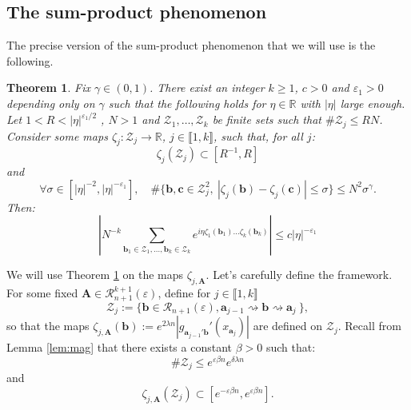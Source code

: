 \documentclass[a4paper]{article}
\newtheorem{theorem}{Theorem}[section]
\theoremstyle{definition}
\begin{document}
\subsection{The sum-product phenomenon}\label{sec:sumprod}


The precise version of the sum-product phenomenon that we will use is the following.

\begin{theorem}\label{th:sumprod}\cite{SS20}
Fix $\gamma \in (0,1)$. There exist an integer $k \geq 1$, $c>0$ and $\varepsilon_1 > 0$ depending only on $\gamma$ such that the following holds for $\eta \in \mathbb{R}$ with $|\eta|$ large enough. Let $1 < R < |\eta|^{\varepsilon_1/2}$ , $N > 1$ and $\mathcal{Z}_1,\dots , \mathcal{Z}_k$ be finite sets such that $ \# \mathcal{Z}_j \leq RN$. Consider some maps $\zeta_j : \mathcal{Z}_j \rightarrow \mathbb{R} $, $j \in \llbracket 1, k \rrbracket $, such that, for all $j$:
$$ \zeta_j ( \mathcal{Z}_j ) \subset [R^{-1},R] $$ and 
$$\forall \sigma \in [|\eta|^{-2}, |\eta|^{- \varepsilon_1}], \quad \# \{\mathbf{b} , \mathbf{c} \in \mathcal{Z}^2_j , \ |\zeta_j(\mathbf{b}) - \zeta_j(\mathbf{c})| \leq \sigma \} \leq N^2 \sigma^{\gamma}.$$
Then: 
$$ \left| N^{-k} \sum_{\mathbf{b}_1 \in \mathcal{Z}_1,\dots,\mathbf{b}_k \in \mathcal{Z}_k} e^{ i \eta \zeta_1(\mathbf{b}_1) \dots \zeta_k(\mathbf{b}_k)} \right| \leq c |\eta|^{-{\varepsilon_1}}$$
\end{theorem}

We will use Theorem \ref{th:sumprod} on the maps $\zeta_{j,\mathbf{A}}$.
Let's carefully define the framework. \\
For some fixed $\mathbf{A} \in \mathcal{R}_{n+1}^{k+1}(\varepsilon)$, define for $j \in \llbracket 1, k \rrbracket$  $$ \mathcal{Z}_j := \{ \mathbf{b} \in \mathcal{R}_{n+1}(\varepsilon) , \mathbf{a}_{j-1} \rightsquigarrow \mathbf{b} \rightsquigarrow \mathbf{a}_j \  \} ,$$
so that the maps $\zeta_{j,\mathbf{A}}(\mathbf{b}) := e^{2 \lambda n} |g_{\mathbf{a}_{j-1}' \mathbf{b}}'(x_{{\mathbf{a}}_j})|$ are defined on $\mathcal{Z}_j$. Recall from Lemma \ref{lem:mag} that there exists a constant $\beta>0$  such that:
$$\# \mathcal{Z}_j \leq e^{\varepsilon \beta n} e^{ \delta \lambda n} $$
and
$$ \zeta_{j,\mathbf{A}}( \mathcal{Z}_j ) \subset \left[ e^{- \varepsilon \beta n}, e^{\varepsilon \beta n} \right] .$$
\end{document}
